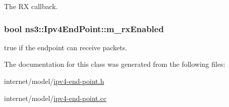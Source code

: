 The RX callback. 

\subsubsection[{\texorpdfstring{m\+\_\+rx\+Enabled}{m_rxEnabled}}]{\setlength{\rightskip}{0pt plus 5cm}bool ns3\+::\+Ipv4\+End\+Point\+::m\+\_\+rx\+Enabled\hspace{0.3cm}{\ttfamily [private]}}\hypertarget{classns3_1_1Ipv4EndPoint_a0f0079b1a77f91505def1f7000a8c2b1}{}\label{classns3_1_1Ipv4EndPoint_a0f0079b1a77f91505def1f7000a8c2b1}


true if the endpoint can receive packets. 



The documentation for this class was generated from the following files\+:\begin{DoxyCompactItemize}
\item 
internet/model/\hyperlink{ipv4-end-point_8h}{ipv4-\/end-\/point.\+h}\item 
internet/model/\hyperlink{ipv4-end-point_8cc}{ipv4-\/end-\/point.\+cc}\end{DoxyCompactItemize}
